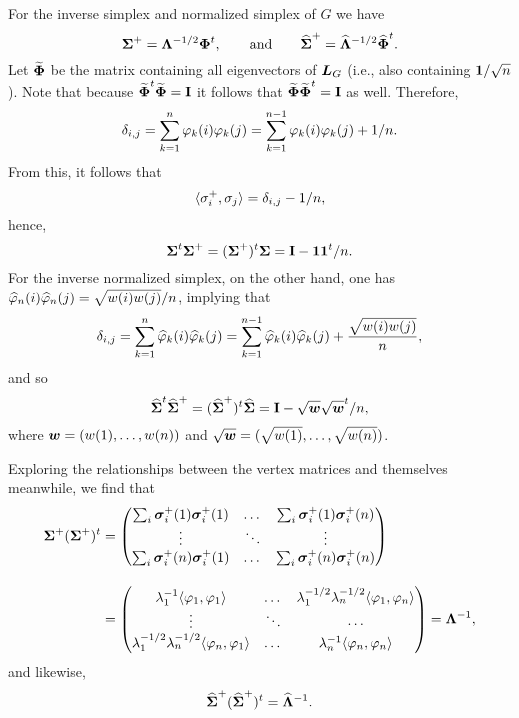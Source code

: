 For the inverse simplex and normalized simplex of $G$ we have 
\[\boldsymbol{\Sigma}^+ = \vb{\Lambda}^{-1/2}\boldsymbol{\Phi}^t,\qquad \text{and} \qquad \widehat{\boldsymbol{\Sigma}}^+ = \widehat{\vb{\Lambda}}^{-1/2}\widehat{\boldsymbol{\Phi}}^t.\]
Let $\widetilde{\boldsymbol{\Phi}}$ be the matrix containing all eigenvectors of $\vb*{L}_G$ (i.e., also containing $\vb{1}/\sqrt{n}$).  Note that because $\widetilde{\boldsymbol{\Phi}}^t \widetilde{\boldsymbol{\Phi}}=\vb{I}$ it follows that $\widetilde{\boldsymbol{\Phi}}\widetilde{\boldsymbol{\Phi}}^t=\vb{I}$ as well. Therefore, 
\begin{equation*}\delta_{i,j}=\sum_{k=1}^n \varphi_k(i)\varphi_k(j) = \sum_{k=1}^{n-1} \varphi_k(i)\varphi_k(j) + 1/n.
\end{equation*}
From this, it follows that 
\[\langle\sigma_i^+,\sigma_j\rangle = \delta_{i,j} - 1/n,\]
hence, 
\begin{equation}
\label{eq:sv+sv}
    \boldsymbol{\Sigma}^t\boldsymbol{\Sigma}^+=(\boldsymbol{\Sigma}^+)^t\boldsymbol{\Sigma}=\vb{I}-\vb{1}\vb{1}^t/n.
\end{equation}
For the inverse normalized simplex, on the other hand, one has $\widehat{\varphi}_{n}(i)\widehat{\varphi}_{n}(j)=\sqrt{w(i)w(j)}/n$, implying that 
\begin{equation*}\delta_{i,j}=\sum_{k=1}^n \widehat{\varphi}_k(i)\widehat{\varphi}_k(j) = \sum_{k=1}^{n-1} \widehat{\varphi}_k(i)\widehat{\varphi}_k(j) + \frac{\sqrt{w(i)w(j)}}{n},
\end{equation*}
and so 
\begin{equation}
\label{eq:svn+svn}
\widehat{\boldsymbol{\Sigma}}^t\widehat{\boldsymbol{\Sigma}}^+=(\widehat{\boldsymbol{\Sigma}}^+)^t\widehat{\boldsymbol{\Sigma}}=\vb{I}-\sqrt{\vb*{w}}\sqrt{\vb*{w}}^t/n,
\end{equation}
where $\vb*{w}=(w(1),\dots,w(n))$ and $\sqrt{\vb*{w}}=(\sqrt{w(1)},\dots,\sqrt{w(n)})$. 

Exploring the relationships between the vertex matrices and themselves meanwhile,  we find that 
\begin{align}
\boldsymbol{\Sigma}^+(\boldsymbol{\Sigma}^+)^t &= 
\begin{pmatrix}
\sum_i \vb*{\sigma}_i^+(1)\vb*{\sigma}_i^+(1) & \dots & \sum_i \vb*{\sigma}_i^+(1)\vb*{\sigma}_i^+(n) \\
\vdots &\ddots  & \vdots \\
\sum_i \vb*{\sigma}_i^+(n)\vb*{\sigma}_i^+(1) & \dots & \sum_i \vb*{\sigma}_i^+(n)\vb*{\sigma}_i^+(n)
\end{pmatrix}\notag 
\\[10pt] 
&= 
\begin{pmatrix}
\lambda_1^{-1} \langle \varphi_1,\varphi_1\rangle & \dots & \lambda_1^{-1/2}\lambda_n^{-1/2}\langle \varphi_1,\varphi_n\rangle \\
\vdots & \ddots & \cdots \\
\lambda_1^{-1/2}\lambda_n^{-1/2}\langle \varphi_n,\varphi_1\rangle & \dots &\lambda_n^{-1} \langle \varphi_n,\varphi_n\rangle 
\end{pmatrix} = \vb{\Lambda}^{-1},\label{eq:SvSv+}
\end{align}
and likewise, 
\begin{equation}
\label{eq:SvnSvn+}
\widehat{\boldsymbol{\Sigma}}^+(\widehat{\boldsymbol{\Sigma}}^+)^t = \widehat{\vb{\Lambda}}^{-1}.
\end{equation}







